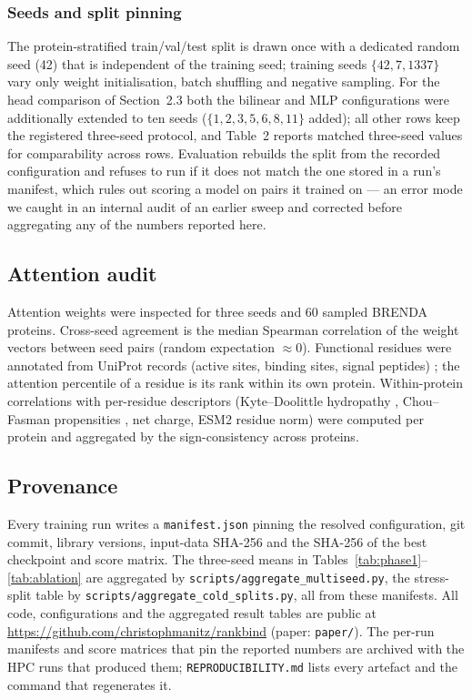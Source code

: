 \documentclass[11pt,a4paper]{article}
\begin{document}
\subsubsection{Seeds and split pinning}
\label{sec:seeds}

The protein-stratified train/val/test split is drawn once with a dedicated
random seed (42) that is independent of the training seed; training seeds
$\{42, 7, 1337\}$ vary only weight initialisation, batch shuffling and
negative sampling. For the head comparison of Section~2.3 both the bilinear
and MLP configurations were additionally extended to ten seeds
($\{1, 2, 3, 5, 6, 8, 11\}$ added); all other rows keep the registered
three-seed protocol, and Table~2 reports matched three-seed values for
comparability across rows. Evaluation rebuilds the split from the recorded
configuration and refuses to run if it does not match the one stored in a
run's manifest, which rules out scoring a model on pairs it trained on ---
an error mode we caught in an internal audit of an earlier sweep and
corrected before aggregating any of the numbers reported here.

\subsection{Attention audit}
\label{sec:audit}

Attention weights were inspected for three seeds and 60 sampled BRENDA
proteins. Cross-seed agreement is the median Spearman correlation of the
weight vectors between seed pairs (random expectation $\approx 0$).
Functional residues were annotated from UniProt records (active sites,
binding sites, signal peptides) \citep{uniprot2023}; the attention
percentile of a residue is its rank within its own protein. Within-protein
correlations with per-residue descriptors (Kyte--Doolittle hydropathy
\citep{kytedoolittle1982}, Chou--Fasman propensities
\citep{choufasman1978}, net charge, ESM2 residue norm) were computed per
protein and aggregated by the sign-consistency across proteins.

\subsection{Provenance}
\label{sec:provenance}

Every training run writes a \texttt{manifest.json} pinning the resolved
configuration, git commit, library versions, input-data SHA-256 and the
SHA-256 of the best checkpoint and score matrix. The three-seed means in
Tables~\ref{tab:phase1}--\ref{tab:ablation} are aggregated by
\texttt{scripts/aggregate\_multiseed.py}, the stress-split table by
\texttt{scripts/aggregate\_cold\_splits.py}, all from these manifests. All code,
configurations and the aggregated result tables are public at
\url{https://github.com/christophmanitz/rankbind} (paper: \texttt{paper/}).
The per-run manifests and score matrices that pin the reported numbers are
archived with the HPC runs that produced them; \texttt{REPRODUCIBILITY.md}
lists every artefact and the command that regenerates it.
\end{document}

